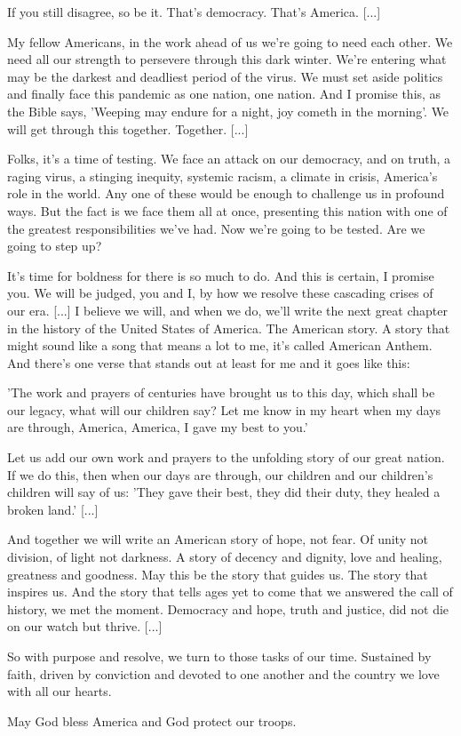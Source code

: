 \documentclass[10pt,a4paper]{article}
\begin{document}
If you still disagree, so be it. That's democracy. That's America. [...]

My fellow Americans, in the work ahead of us we're going to need each other. We need all our strength to persevere through this dark winter. We're entering what may be the darkest and deadliest period of the virus. We must set aside politics and finally face this pandemic as one nation, one nation. And I promise this, as the Bible says, 'Weeping may endure for a night, joy cometh in the morning'. We will get through this together. Together. [...]

Folks, it's a time of testing. We face an attack on our democracy, and on truth, a raging virus, a stinging inequity, systemic racism, a climate in crisis, America's role in the world. Any one of these would be enough to challenge us in profound ways. But the fact is we face them all at once, presenting this nation with one of the greatest responsibilities we've had. Now we're going to be tested. Are we going to step up?

It's time for boldness for there is so much to do. And this is certain, I promise you. We will be judged, you and I, by how we resolve these cascading crises of our era. [...] I believe we will, and when we do, we'll write the next great chapter in the history of the United States of America. The American story. A story that might sound like a song that means a lot to me, it's called American Anthem. And there's one verse that stands out at least for me and it goes like this:

'The work and prayers of centuries have brought us to this day, which shall be our legacy, what will our children say? Let me know in my heart when my days are through, America, America, I gave my best to you.'

Let us add our own work and prayers to the unfolding story of our great nation. If we do this, then when our days are through, our children and our children's children will say of us: 'They gave their best, they did their duty, they healed a broken land.' [...]

And together we will write an American story of hope, not fear. Of unity not division, of light not darkness. A story of decency and dignity, love and healing, greatness and goodness. May this be the story that guides us. The story that inspires us. And the story that tells ages yet to come that we answered the call of history, we met the moment. Democracy and hope, truth and justice, did not die on our watch but thrive. [...]

So with purpose and resolve, we turn to those tasks of our time. Sustained by faith, driven by conviction and devoted to one another and the country we love with all our hearts.

May God bless America and God protect our troops.
\end{document}
